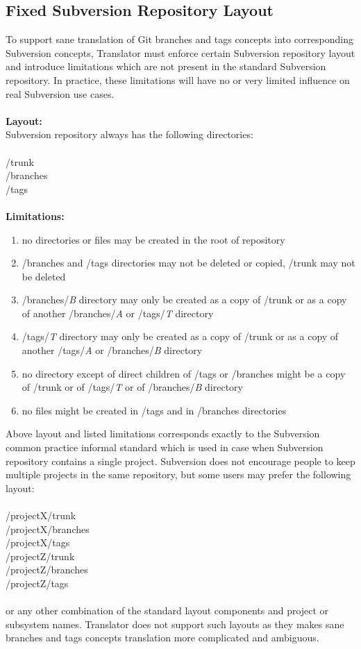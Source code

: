 \subsection{Fixed Subversion Repository Layout}

To support sane translation of Git branches and tags concepts into corresponding Subversion concepts, Translator must enforce certain Subversion repository layout and introduce limitations which are not present in the standard Subversion repository. 
In practice, these limitations will have no or very limited influence on real Subversion use cases.
\\\\
\textbf{Layout:}\\ 
Subversion repository always has the following directories:
\\\\
/trunk\\
/branches\\
/tags\\\\
\textbf{Limitations:}
\begin{enumerate}
\compactlist
\item no directories or files may be created in the root of repository
\item /branches and /tags directories may not be deleted or copied, /trunk may not be deleted
\item /branches/\emph{B} directory may only be created as a copy of /trunk or
as a copy of another /branches/\emph{A} or /tags/\emph{T} directory
\item /tags/\emph{T} directory may only be created as a copy of /trunk or
as a copy of another /tags/\emph{A} or /branches/\emph{B} directory
\item no directory except of direct children of /tags or /branches might be a
copy of /trunk or of /tags/\emph{T} or of /branches/\emph{B} directory
\item no files might be created in /tags and in /branches directories
\end{enumerate}
Above layout and listed limitations corresponds exactly to the Subversion common practice informal standard which
is used in case when Subversion repository contains a single project. Subversion does not encourage people 
to keep multiple projects in the same repository, but some users may prefer the following layout:
\\\\
/projectX/trunk\\
/projectX/branches\\
/projectX/tags\\
/projectZ/trunk\\
/projectZ/branches\\
/projectZ/tags\\\\
or any other combination of the standard layout components and project or subsystem names. Translator does not support such layouts as they 
makes sane branches and tags concepts translation more complicated and ambiguous.
